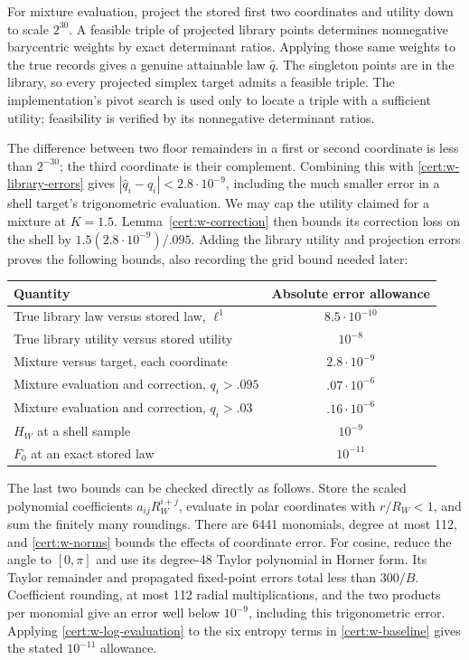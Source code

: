 For mixture evaluation, project the stored first two coordinates and
utility down to scale $2^{30}$.  A feasible triple of projected library
points determines nonnegative barycentric weights by exact determinant
ratios.  Applying those same weights to the true records gives a genuine
attainable law $\widehat q$.  The singleton points are in the library,
so every projected simplex target admits a feasible triple.  The
implementation's pivot search is used only to locate a triple with a
sufficient utility; feasibility is verified by its nonnegative determinant
ratios.

The difference between two floor remainders in a first or second
coordinate is less than $2^{-30}$; the third coordinate is their
complement.  Combining this with \eqref{cert:w-library-errors} gives
$|\widehat q_i-q_i|<2.8\cdot10^{-9}$, including the much smaller
error in a shell target's trigonometric evaluation.  We may cap the
utility claimed for a mixture at $K=1.5$.  Lemma~\ref{cert:w-correction}
then bounds its correction loss on the shell by
$1.5(2.8\cdot10^{-9})/.095$.  Adding the library utility and projection
errors proves the following bounds, also recording the grid bound needed
later:
\begin{center}
\begin{tabular}{@{}lc@{}}
\toprule
Quantity & Absolute error allowance\\
\midrule
True library law versus stored law, $\ell^1$ & $8.5\cdot10^{-10}$\\
True library utility versus stored utility & $10^{-8}$\\
Mixture versus target, each coordinate & $2.8\cdot10^{-9}$\\
Mixture evaluation and correction, $q_i>.095$ & $.07\cdot10^{-6}$\\
Mixture evaluation and correction, $q_i>.03$ & $.16\cdot10^{-6}$\\
$H_W$ at a shell sample & $10^{-9}$\\
$F_0$ at an exact stored law & $10^{-11}$\\
\bottomrule
\end{tabular}
\end{center}
The last two bounds can be checked directly as follows.  Store the
scaled polynomial coefficients $a_{ij}R_W^{i+j}$, evaluate in polar
coordinates with $r/R_W<1$, and sum the finitely many roundings.
There are 6441 monomials, degree at most 112, and
\eqref{cert:w-norms} bounds the effects of coordinate error.
For cosine, reduce the angle to $[0,\pi]$ and use its degree-48 Taylor
polynomial in Horner form.  Its Taylor remainder and propagated
fixed-point errors total less than $300/B$.  Coefficient rounding,
at most 112 radial multiplications, and the two products per monomial
give an error well below $10^{-9}$, including this trigonometric
error.  Applying \eqref{cert:w-log-evaluation} to the six entropy terms
in \eqref{cert:w-baseline} gives the stated $10^{-11}$ allowance.

